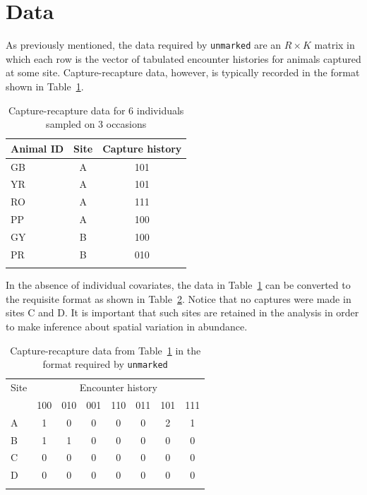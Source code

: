 \documentclass[a4paper]{article}
\begin{document}
\section{Data}
As previously mentioned, the data required by \texttt{unmarked} are an $R
\times K$
matrix in which each row is the vector of tabulated encounter
histories for animals captured at some site. Capture-recapture data,
however, is typically recorded in the format shown in
Table~\ref{tab:raw}.

\begin{table}[h]
  \footnotesize
  \begin{center}
  \caption{Capture-recapture data for 6 individuals sampled on 3
    occasions}
  \vspace{0.3cm}
  \begin{tabular}{lcc}
    \hline
    Animal ID   & Site  & Capture history \\
    \hline
    GB        & A     & 101 \\
    YR        & A     & 101 \\
    RO        & A     & 111 \\
    PP        & A     & 100 \\
    GY        & B     & 100 \\
    PR        & B     & 010 \\
    \hline
  \label{tab:raw}
  \end{tabular}
  \end{center}
\end{table}

In the absence of individual covariates, the data in
Table~\ref{tab:raw} can be converted to the requisite format as shown
in Table~\ref{tab:format}. Notice that no captures were made in sites
C and D. It is important that such sites are retained in the analysis
in order to make inference about spatial variation in abundance.

\begin{table}[h]
  \footnotesize
  \begin{center}
  \caption{Capture-recapture data from Table~\ref{tab:raw} in the
    format required by \texttt{unmarked}}
  \vspace{0.3cm}
  \begin{tabular}{lccccccc}
    \hline
    Site  & \multicolumn{7}{c}{Encounter history} \\
    \cline{2-8}
          & 100 & 010 & 001 & 110 & 011 & 101 & 111 \\
    \hline
    A     & 1   & 0   & 0   & 0   & 0   & 2   & 1   \\
    B     & 1   & 1   & 0   & 0   & 0   & 0   & 0   \\
    C     & 0   & 0   & 0   & 0   & 0   & 0   & 0   \\
    D     & 0   & 0   & 0   & 0   & 0   & 0   & 0   \\
    \hline
  \label{tab:format}
  \end{tabular}
  \end{center}
\end{table}
\end{document}
